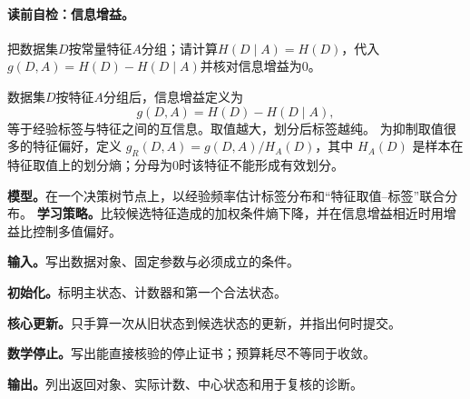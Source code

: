 \paragraph{读前自检：信息增益。}把数据集$D$按常量特征$A$分组；请计算$H(D\mid A)=H(D)$，代入$g(D,A)=H(D)-H(D\mid A)$并核对信息增益为$0$。\par

数据集$D$按特征$A$分组后，信息增益定义为
\[
g(D,A)=H(D)-H(D\mid A),
\]
等于经验标签与特征之间的互信息。取值越大，划分后标签越纯。
为抑制取值很多的特征偏好，定义 $g_R(D,A)=g(D,A)/H_A(D)$，其中 $H_A(D)$ 是样本在特征取值上的划分熵；分母为0时该特征不能形成有效划分。

\label{struct:V1-C06-CH08}
\textbf{模型。}在一个决策树节点上，以经验频率估计标签分布和“特征取值--标签”联合分布。
\label{struct:V1-C06-CH09}
\textbf{学习策略。}比较候选特征造成的加权条件熵下降，并在信息增益相近时用增益比控制多值偏好。

\label{struct:V1-C06-CH10}
\label{struct:V1-C06-CH21}
\label{struct:V1-C06-CH22}
\label{struct:V1-C06-CH23}
\label{struct:V1-C06-CH24}
\label{struct:V1-C06-CH25}
\label{struct:V1-C06-CH26}
\label{struct:V1-C06-CH27}

\begin{keypointbox}[title={离散特征的信息增益与增益比评估：五步阅读}]
\textbf{输入。}写出数据对象、固定参数与必须成立的条件。\par
\textbf{初始化。}标明主状态、计数器和第一个合法状态。\par
\textbf{核心更新。}只手算一次从旧状态到候选状态的更新，并指出何时提交。\par
\textbf{数学停止。}写出能直接核验的停止证书；预算耗尽不等同于收敛。\par
\textbf{输出。}列出返回对象、实际计数、中心状态和用于复核的诊断。
\end{keypointbox}

